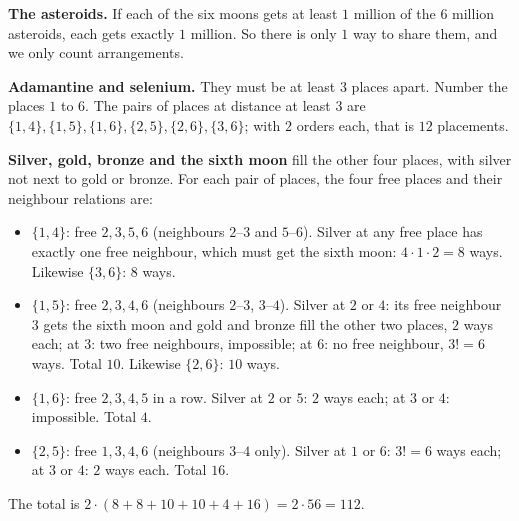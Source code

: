 \textbf{The asteroids.} If each of the six moons gets at least $1$ million of the $6$ million asteroids, each gets exactly $1$ million. So there is only $1$ way to share them, and we only count arrangements.

\textbf{Adamantine and selenium.} They must be at least $3$ places apart. Number the places $1$ to $6$. The pairs of places at distance at least $3$ are $\{1,4\},\{1,5\},\{1,6\},\{2,5\},\{2,6\},\{3,6\}$; with $2$ orders each, that is $12$ placements.

\textbf{Silver, gold, bronze and the sixth moon} fill the other four places, with silver not next to gold or bronze. For each pair of places, the four free places and their neighbour relations are:
\begin{itemize}
\item $\{1,4\}$: free $2,3,5,6$ (neighbours $2$--$3$ and $5$--$6$). Silver at any free place has exactly one free neighbour, which must get the sixth moon: $4\cdot1\cdot2=8$ ways. Likewise $\{3,6\}$: $8$ ways.
\item $\{1,5\}$: free $2,3,4,6$ (neighbours $2$--$3$, $3$--$4$). Silver at $2$ or $4$: its free neighbour $3$ gets the sixth moon and gold and bronze fill the other two places, $2$ ways each; at $3$: two free neighbours, impossible; at $6$: no free neighbour, $3!=6$ ways. Total $10$. Likewise $\{2,6\}$: $10$ ways.
\item $\{1,6\}$: free $2,3,4,5$ in a row. Silver at $2$ or $5$: $2$ ways each; at $3$ or $4$: impossible. Total $4$.
\item $\{2,5\}$: free $1,3,4,6$ (neighbours $3$--$4$ only). Silver at $1$ or $6$: $3!=6$ ways each; at $3$ or $4$: $2$ ways each. Total $16$.
\end{itemize}
The total is $2\cdot(8+8+10+10+4+16)=2\cdot56=\boxed{112}$.
